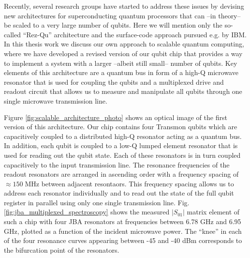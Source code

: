 Recently, several research groups have started to address these issues by devising new architectures for superconducting quantum processors that can --in theory-- be scaled to a very large number of qubits. Here we will mention only the so-called ``Rez-Qu'' architecture\citep{galiautdinov_resonatorzero-qubit_2012} and the surface-code approach\citep{divincenzo_fault-tolerant_2009} pursued e.g. by IBM. In this thesis work we discuss our own approach to scalable quantum computing, where we have developed a revised version of our qubit chip that provides a way to implement a system with a larger --albeit still small-- number of qubits. Key elements of this architecture are a quantum bus in form of a high-Q microwave resonator that is used for coupling the qubits and a multiplexed drive and readout circuit that allows us to measure and manipulate all qubits through one single microwave transmission line. 

Figure \ref{fig:scalable_architecture_photo} shows an optical image of the first version of this architecture. Our chip contains four Transmon qubits which are capacitively coupled to a distributed high-Q resonator acting as a quantum bus. In addition, each qubit is coupled to a low-Q lumped element resonator that is used for reading out the qubit state. Each of these resonators is in turn coupled capacitively to the input transmission line. The resonance frequencies of the readout resonators are arranged in ascending order with a frequency spacing of $\approx 150\;\mathrm{MHz}$ between adjacent resontaors. This frequency spacing allows us to address each resonator individually and to read out the state of the full qubit register in parallel using only one single transmission line. Fig. \ref{fig:jba_multiplexed_spectroscopy} shows the measured $|S_{01}|$ matrix element of such a chip with four JBA resonators at frequencies between 6.78 GHz and 6.95 GHz, plotted as a function of the incident microwave power. The ``knee'' in each of the four resonance curves appearing between -45 and -40 dBm corresponds to the bifurcation point of the resonators.

